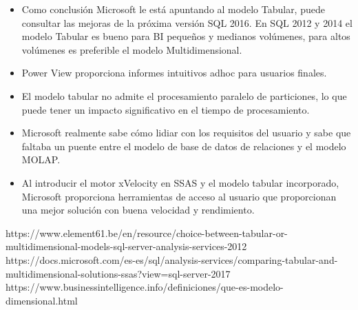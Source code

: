 \documentclass[preprint,12pt]{elsarticle}
\begin{document}
\begin{itemize}
	\item Como conclusión Microsoft le está apuntando al modelo Tabular, puede consultar las mejoras de la próxima versión SQL 2016. En SQL 2012 y 2014 el modelo Tabular es bueno para BI pequeños y medianos volúmenes, para altos volúmenes es preferible el modelo Multidimensional.
	\item Power View proporciona informes intuitivos adhoc para usuarios finales. 
	\item El modelo tabular no admite el procesamiento paralelo de particiones, lo que puede tener un impacto significativo en el tiempo de procesamiento.
	\item Microsoft realmente sabe cómo lidiar con los requisitos del usuario y sabe que faltaba un puente entre el modelo de base de datos de relaciones y el modelo MOLAP. 
	\item Al introducir el motor xVelocity en SSAS y el modelo tabular incorporado, Microsoft proporciona herramientas de acceso al usuario que proporcionan una mejor solución con buena velocidad y rendimiento. 
\end{itemize}

	
	

	
	\newpage
	
	   \begin{thebibliography}{0}

                 \bibitem{} https://www.element61.be/en/resource/choice-between-tabular-or-multidimensional-models-sql-server-analysis-services-2012
                  \bibitem{} https://docs.microsoft.com/es-es/sql/analysis-services/comparing-tabular-and-multidimensional-solutions-ssas?view=sql-server-2017
                     https://www.businessintelligence.info/definiciones/que-es-modelo-dimensional.html


         \end{thebibliography}
	
\end{document}
